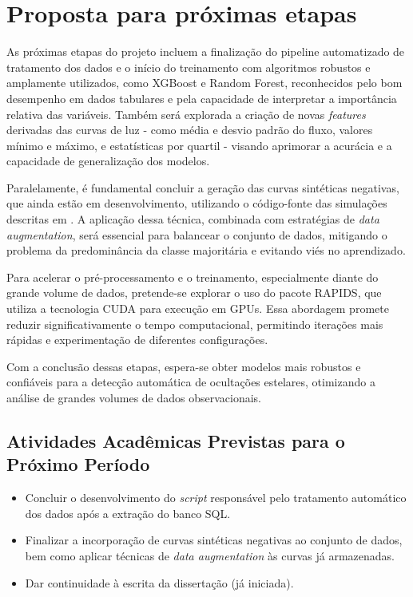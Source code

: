 \documentclass[12pt]{article}
\numberwithin{equation}{section}
\begin{document}

\section{\sc Proposta para próximas etapas}

As próximas etapas do projeto incluem a finalização do pipeline automatizado de tratamento dos dados e o início do treinamento com algoritmos robustos e amplamente utilizados, como XGBoost e Random Forest, reconhecidos pelo bom desempenho em dados tabulares e pela capacidade de interpretar a importância relativa das variáveis. Também será explorada a criação de novas \textit{features} derivadas das curvas de luz - como média e desvio padrão do fluxo, valores mínimo e máximo, e estatísticas por quartil - visando aprimorar a acurácia e a capacidade de generalização dos modelos.

Paralelamente, é fundamental concluir a geração das curvas sintéticas negativas, que ainda estão em desenvolvimento, utilizando o código-fonte das simulações descritas em \cite{Simulator}. A aplicação dessa técnica, combinada com estratégias de \textit{data augmentation}, será essencial para balancear o conjunto de dados, mitigando o problema da predominância da classe majoritária e evitando viés no aprendizado.

Para acelerar o pré-processamento e o treinamento, especialmente diante do grande volume de dados, pretende-se explorar o uso do pacote RAPIDS, que utiliza a tecnologia CUDA para execução em GPUs. Essa abordagem promete reduzir significativamente o tempo computacional, permitindo iterações mais rápidas e experimentação de diferentes configurações.

Com a conclusão dessas etapas, espera-se obter modelos mais robustos e confiáveis para a detecção automática de ocultações estelares, otimizando a análise de grandes volumes de dados observacionais.



\subsection{Atividades Acadêmicas Previstas para o Próximo Período}

\begin{itemize}
    \item Concluir o desenvolvimento do \textit{script} responsável pelo tratamento automático dos dados após a extração do banco SQL.
    \item Finalizar a incorporação de curvas sintéticas negativas ao conjunto de dados, bem como aplicar técnicas de \textit{data augmentation} às curvas já armazenadas.
    \item Dar continuidade à escrita da dissertação (já iniciada).
\end{itemize}
\end{document}

